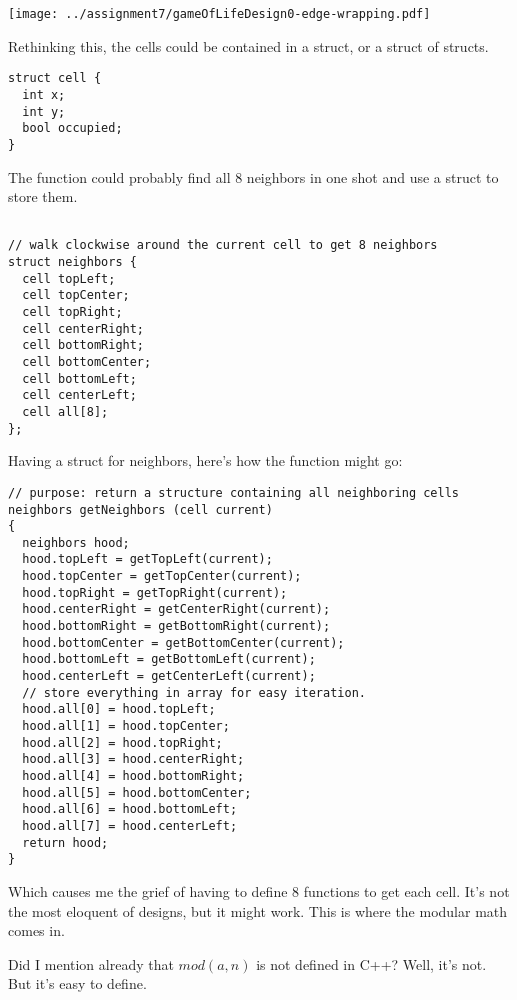 \documentclass[11pt, oneside]{memoir}
\begin{document}
\begin{center}
  \texttt{[image: ../assignment7/gameOfLifeDesign0-edge-wrapping.pdf]}
\end{center}

Rethinking this, the cells could be contained in a struct, or a
struct of structs.


\begin{lstlisting}
struct cell {
  int x;
  int y;
  bool occupied;
}
\end{lstlisting}

The function could probably find all 8 neighbors in one shot and use a
struct to store them.  

\begin{lstlisting}
  
// walk clockwise around the current cell to get 8 neighbors
struct neighbors {
  cell topLeft;
  cell topCenter;
  cell topRight;
  cell centerRight;
  cell bottomRight;
  cell bottomCenter;
  cell bottomLeft;
  cell centerLeft;
  cell all[8];
};

\end{lstlisting}

Having a struct for neighbors, here's how the function might go:

\begin{lstlisting}
// purpose: return a structure containing all neighboring cells
neighbors getNeighbors (cell current)
{
  neighbors hood;
  hood.topLeft = getTopLeft(current);
  hood.topCenter = getTopCenter(current);
  hood.topRight = getTopRight(current);
  hood.centerRight = getCenterRight(current);
  hood.bottomRight = getBottomRight(current);
  hood.bottomCenter = getBottomCenter(current);
  hood.bottomLeft = getBottomLeft(current);
  hood.centerLeft = getCenterLeft(current);
  // store everything in array for easy iteration.
  hood.all[0] = hood.topLeft;
  hood.all[1] = hood.topCenter;
  hood.all[2] = hood.topRight;
  hood.all[3] = hood.centerRight;
  hood.all[4] = hood.bottomRight;
  hood.all[5] = hood.bottomCenter;
  hood.all[6] = hood.bottomLeft;
  hood.all[7] = hood.centerLeft;
  return hood;
}
\end{lstlisting}

Which causes me the grief of having to define 8 functions to get each
cell.  It's not the most eloquent of designs, but it might work. This
is where the modular math comes in.  

Did I mention already that $mod(a,n)$ is not defined in C++?  Well,
it's not.   But it's easy to define. 
\end{document}
